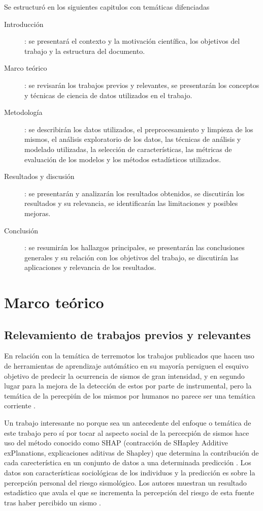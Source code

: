 \documentclass[a4paper]{report}
\begin{document}
Se estructuró en los siguientes capitulos con temáticas difenciadas
\begin{description}
	\item[Introducción]: se presentará el contexto y la motivación científica, los objetivos del trabajo y la estructura del documento.
	\item[Marco teórico]: se revisarán los trabajos previos y relevantes, se presentarán los conceptos y técnicas de ciencia de datos utilizados en el trabajo.
	\item[Metodología]: se describirán los datos utilizados, el preprocesamiento y limpieza de los mismos, el análisis exploratorio de los datos, las técnicas de análisis y modelado utilizadas, la selección de características, las métricas de evaluación de los modelos y los métodos estadísticos utilizados.
	\item[Resultados y discusión]: se presentarán y analizarán los resultados obtenidos, se discutirán los resultados y su relevancia, se identificarán las limitaciones y posibles mejoras.
	\item[Conclusión]: se resumirán los hallazgos principales, se presentarán las conclusiones generales y su relación con los objetivos del trabajo, se discutirán las aplicaciones y relevancia de los resultados.
\end{description}



\chapter{Marco teórico}

\section{Relevamiento de trabajos previos y relevantes}

En relación con la temática de terremotos los trabajos publicados que hacen uso de herramientas de aprendizaje autómático en su mayoría persiguen el esquivo objetivo de predecir la ocurrencia de sismos de gran intensidad, y en segundo lugar para la mejora de la detección de estos por parte de instrumental, pero la temática de la perecpiún de los mismos por humanos no parece ser una temática corriente \cite{hu_applying_2024}.

Un trabajo interesante no porque sea un antecedente del enfoque o temática de este trabajo pero sí por tocar al aspecto social de la percecpión de sismos hace uso del método conocido como SHAP (contracción de SHapley Additive exPlanations, explicaciones aditivas de Shapley) que determina la contribución de cada carecterística en un conjunto de datos a una determinada predicción \cite{molnar_96_2024}.
Los datos son características sociológicas de los individuos y la predicción es sobre la percepción personal del riesgo sismológico.
Los autores muestran un resultado estadístico que avala el que se incrementa la percepción del riesgo de esta fuente tras haber percibido un sismo \cite{bedle_recognizing_2022}.
\end{document}
